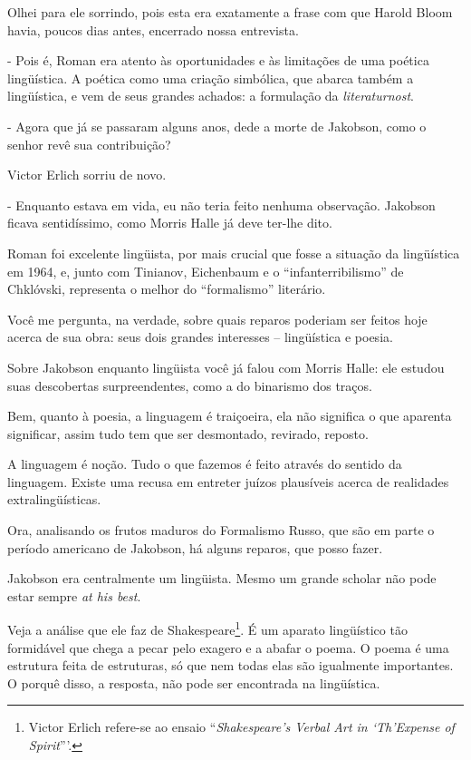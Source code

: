 Olhei para ele sorrindo, pois esta era exatamente a frase com que Harold
Bloom havia, poucos dias antes, encerrado nossa entrevista.

- Pois é, Roman era atento às oportunidades e às limitações de uma
poética lingüística. A poética como uma criação simbólica, que abarca
também a lingüística, e vem de seus grandes achados: a formulação da
\emph{literaturnost}.

- Agora que já se passaram alguns anos, dede a morte de Jakobson, como o
senhor revê sua contribuição?

Victor Erlich sorriu de novo.

- Enquanto estava em vida, eu não teria feito nenhuma observação.
Jakobson ficava sentidíssimo, como Morris Halle já deve ter-lhe dito.

Roman foi excelente lingüista, por mais crucial que fosse a situação da
lingüística em 1964, e, junto com Tinianov, Eichenbaum e o
``infanterribilismo'' de Chklóvski, representa o melhor do
``formalismo'' literário.

Você me pergunta, na verdade, sobre quais reparos poderiam ser feitos
hoje acerca de sua obra: seus dois grandes interesses -- lingüística e
poesia.

Sobre Jakobson enquanto lingüista você já falou com Morris Halle: ele
estudou suas descobertas surpreendentes, como a do binarismo dos traços.

Bem, quanto à poesia, a linguagem é traiçoeira, ela não significa o que
aparenta significar, assim tudo tem que ser desmontado, revirado,
reposto.

A linguagem é noção. Tudo o que fazemos é feito através do sentido da
linguagem. Existe uma recusa em entreter juízos plausíveis acerca de
realidades extralingüísticas.

Ora, analisando os frutos maduros do Formalismo Russo, que são em parte
o período americano de Jakobson, há alguns reparos, que posso fazer.

Jakobson era centralmente um lingüista. Mesmo um grande scholar não pode
estar sempre \emph{at his best}.

Veja a análise que ele faz de Shakespeare\footnote{Victor Erlich
  refere-se ao ensaio ``\emph{Shakespeare's Verbal Art in `Th'Expense of
  Spirit}'''.}. É um aparato lingüístico tão formidável que chega a
pecar pelo exagero e a abafar o poema. O poema é uma estrutura feita de
estruturas, só que nem todas elas são igualmente importantes. O porquê
disso, a resposta, não pode ser encontrada na lingüística.

